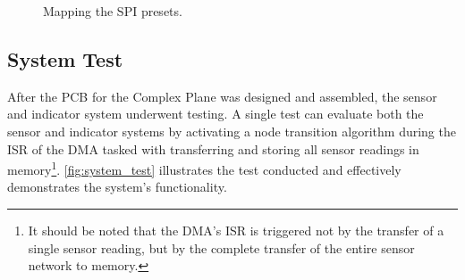 \documentclass[12pt]{article}
\numberwithin{subsubsubsection}{subsubsection}
\begin{document}
\begin{figure}[H]
    \centering
    \caption{Mapping the SPI presets.}
    \label{fig:mapping}
\end{figure}

\subsection{System Test}

After the PCB for the Complex Plane was designed and assembled, the sensor and indicator system underwent testing. A single test can evaluate both the sensor and indicator systems by activating a node transition algorithm during the ISR of the DMA tasked with transferring and storing all sensor readings in memory\footnote{It should be noted that the DMA’s ISR is triggered not by the transfer of a single sensor reading, but by the complete transfer of the entire sensor network to memory.}. \autoref{fig:system_test} illustrates the test conducted and effectively demonstrates the system's functionality.
\end{document}
